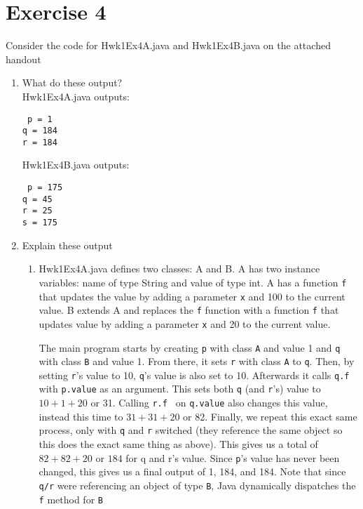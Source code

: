 \documentclass[12pt]{article}
\begin{document}
\section{Exercise 4}
Consider the code for Hwk1Ex4A.java and Hwk1Ex4B.java on the attached handout \\
\begin{enumerate}[label=(\alph*)]
\item What do these output? \\
  Hwk1Ex4A.java outputs:

  {\tt
    p = 1 \\
    q = 184 \\
    r = 184
  }

  Hwk1Ex4B.java outputs:

  {\tt
    p = 175 \\
    q = 45 \\
    r = 25 \\
    s = 175
  }

\item Explain these output \\
  \begin{enumerate}

  \item   Hwk1Ex4A.java defines two classes: A and B. A has two instance variables: name
    of type String and value of type int. A has a function {\tt f} that updates
    the value by adding a parameter {\tt x} and 100 to the current value. B
    extends A and replaces the {\tt f} function with a function {\tt f} that
    updates value by adding a parameter {\tt x} and 20 to the current value.

    The main program starts by creating {\tt p} with class {\tt A} and value 1 and
    {\tt q} with class {\tt B} and value 1. From there, it sets {\tt r} with class
    {\tt A} to {\tt q}. Then, by setting {\tt r}'s value to 10, {\tt q}'s value is
    also set to 10. Afterwards it calls {\tt q.f} with {\tt p.value} as an
    argument. This sets both {\tt q} (and {\tt r}'s) value to $10 + 1 + 20$ or 31.
    Calling {\tt r.f } on {\tt q.value} also changes this value, instead this time
    to $ 31 + 31 + 20 $ or 82. Finally, we repeat this exact same process, only
    with {\tt q} and {\tt r} switched (they reference the same object so this does
    the exact same thing as above). This gives us a total of $82 + 82 + 20$ or
    $184$ for q and r's value. Since {\tt p}'s value has never been changed, this
    gives us a final output of 1, 184, and 184. Note that since {\tt q/r} were
    referencing an object of type {\tt B}, Java dynamically dispatches the {\tt f}
    method for {\tt B}


\end{enumerate}
\end{enumerate}
\end{document}
